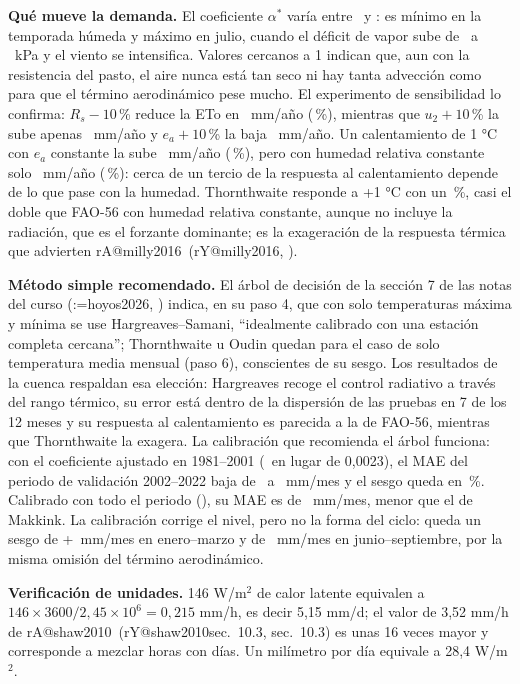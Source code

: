 \documentclass[12pt,a4paper]{article}
\makeatletter
\newcommand{\parencite}[2][]{(\@tempswafalse\@for\rk:=#2\do{\if@tempswa; \fi\@tempswatrue\csname rA@\rk\endcsname, \csname rY@\rk\endcsname}\ifx\relax#1\relax\else, #1\fi)}
\newcommand{\textcite}[2][]{\csname rA@#2\endcsname\ (\csname rY@#2\endcsname\ifx\relax#1\relax\else, #1\fi)}
\makeatother
\begin{document}
\textbf{Qué mueve la demanda.} El coeficiente $\alpha^*$ varía entre \AlfaMin\ y \AlfaMax: es mínimo en la temporada húmeda y máximo en julio, cuando el déficit de vapor sube de \VPDMin\ a \VPDMax\ kPa y el viento se intensifica. Valores cercanos a 1 indican que, aun con la resistencia del pasto, el aire nunca está tan seco ni hay tanta advección como para que el término aerodinámico pese mucho. El experimento de sensibilidad lo confirma: $R_s-10$\,\% reduce la ETo en \SensRs\ mm/año (\SensPctRs\,\%), mientras que $u_2+10$\,\% la sube apenas \SensUdos\ mm/año y $e_a+10$\,\% la baja \SensEa\ mm/año. Un calentamiento de 1 °C con $e_a$ constante la sube \SensTunoEa\ mm/año (\SensPctTunoEa\,\%), pero con humedad relativa constante solo \SensTunoHR\ mm/año (\SensPctTunoHR\,\%): cerca de un tercio de la respuesta al calentamiento depende de lo que pase con la humedad. Thornthwaite responde a +1 °C con un \SensThornTuno\,\%, casi el doble que FAO-56 con humedad relativa constante, aunque no incluye la radiación, que es el forzante dominante; es la exageración de la respuesta térmica que advierten \textcite{milly2016}.

\textbf{Método simple recomendado.} El árbol de decisión de la sección 7 de las notas del curso \parencite{hoyos2026} indica, en su paso 4, que con solo temperaturas máxima y mínima se use Hargreaves--Samani, ``idealmente calibrado con una estación completa cercana''; Thornthwaite u Oudin quedan para el caso de solo temperatura media mensual (paso 6), conscientes de su sesgo. Los resultados de la cuenca respaldan esa elección: Hargreaves recoge el control radiativo a través del rango térmico, su error está dentro de la dispersión de las pruebas en 7 de los 12 meses y su respuesta al calentamiento es parecida a la de FAO-56, mientras que Thornthwaite la exagera. La calibración que recomienda el árbol funciona: con el coeficiente ajustado en 1981--2001 (\HSkCal\ en lugar de 0,0023), el MAE del periodo de validación 2002--2022 baja de \HSmaeValOrig\ a \HSmaeValCal\ mm/mes y el sesgo queda en \HSsesgoValCal\,\%. Calibrado con todo el periodo (\HSkTot), su MAE es de \HSmaeTot\ mm/mes, menor que el de Makkink. La calibración corrige el nivel, pero no la forma del ciclo: queda un sesgo de +\HScalHum\ mm/mes en enero--marzo y de \HScalSeco\ mm/mes en junio--septiembre, por la misma omisión del término aerodinámico.

\textbf{Verificación de unidades.} 146 W/m$^2$ de calor latente equivalen a $146\times3600/2{,}45\times10^6=0{,}215$ mm/h, es decir 5,15 mm/d; el valor de 3,52 mm/h de \textcite[sec.~10.3]{shaw2010} es unas 16 veces mayor y corresponde a mezclar horas con días. Un milímetro por día equivale a 28,4 W/m$^2$.
\end{document}
